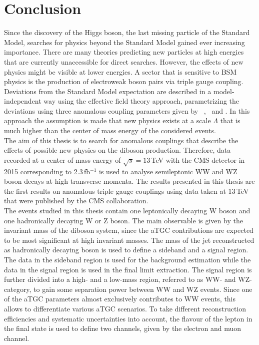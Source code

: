 \chapter{Conclusion}
\label{ch:Conclusion}
Since the discovery of the Higgs boson, the last missing particle of the Standard Model, searches for physics beyond the Standard Model gained ever increasing importance. There are many theories predicting new particles at high energies that are currently unaccessible for direct searches. However, the effects of new physics might be visible at lower energies. A sector that is sensitive to BSM physics is the production of electroweak boson pairs via triple gauge coupling. Deviations from the Standard Model expectation are described in a model-independent way using the effective field theory approach, parametrizing the deviations using three anomalous coupling parameters given by \Tcwww \ , \Tccw \ and \Tcb . In this approach the assumption is made that new physics exists at a scale $\Lambda$ that is much higher than the center of mass energy of the considered events.\\

The aim of this thesis is to search for anomalous couplings that describe the effects of possible new physics on the diboson production. Therefore, data recorded at a center of mass energy of $\sqrt{s}=13$\,TeV with the CMS detector in 2015 corresponding to 2.3\,fb$^{-1}$ is used to analyse semileptonic WW and WZ boson decays at high transverse momenta. The results presented in this thesis are the first results on anomalous triple gauge couplings using data taken at 13\,TeV that were published by the CMS collaboration.\\

The events studied in this thesis contain one leptonically decaying W boson and one hadronically decaying W or Z boson. The main observable is given by the invariant mass of the diboson system, since the aTGC contributions are expected to be most significant at high invariant masses. The mass of the jet reconstructed as hadronically decaying boson is used to define a sideband and a signal region. The data in the sideband region is used for the background estimation while the data in the signal region is used in the final limit extraction. The signal region is further divided into a high- and a low-mass region, referred to as WW- and WZ-category, to gain some separation power between WW and WZ events. Since one of the aTGC parameters almost exclusively contributes to WW events, this allows to differentiate various aTGC scenarios. To take different reconstruction efficiencies and systematic uncertainties into account, the flavour of the lepton in the final state is used to define two channels, given by the electron and muon channel.\\


